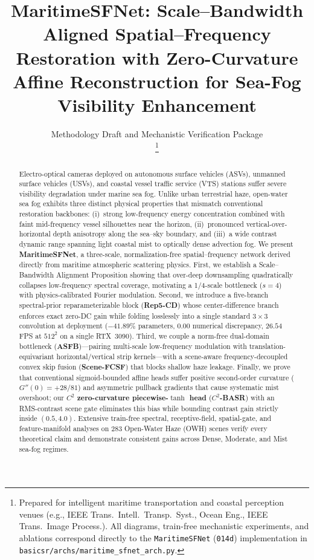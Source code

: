 \documentclass[journal,twoside]{IEEEtran}
\title{MaritimeSFNet: Scale--Bandwidth Aligned Spatial--Frequency Restoration with Zero-Curvature Affine Reconstruction for Sea-Fog Visibility Enhancement}
\author{Methodology Draft and Mechanistic Verification Package\\
\thanks{Prepared for intelligent maritime transportation and coastal perception venues (e.g., IEEE Trans.\ Intell.\ Transp.\ Syst., Ocean Eng., IEEE Trans.\ Image Process.). All diagrams, train-free mechanistic experiments, and ablations correspond directly to the \texttt{MaritimeSFNet} (\texttt{014d}) implementation in \texttt{basicsr/archs/maritime\_sfnet\_arch.py}.}}
\begin{document}
\maketitle

\begin{abstract}
Electro-optical cameras deployed on autonomous surface vehicles (ASVs), unmanned surface vehicles (USVs), and coastal vessel traffic service (VTS) stations suffer severe visibility degradation under marine sea fog. Unlike urban terrestrial haze, open-water sea fog exhibits three distinct physical properties that mismatch conventional restoration backbones: (i)~strong low-frequency energy concentration combined with faint mid-frequency vessel silhouettes near the horizon, (ii)~pronounced vertical-over-horizontal depth anisotropy along the sea--sky boundary, and (iii)~a wide contrast dynamic range spanning light coastal mist to optically dense advection fog. We present \textbf{MaritimeSFNet}, a three-scale, normalization-free spatial--frequency network derived directly from maritime atmospheric scattering physics. First, we establish a Scale--Bandwidth Alignment Proposition showing that over-deep downsampling quadratically collapses low-frequency spectral coverage, motivating a 1/4-scale bottleneck ($s=4$) with physics-calibrated Fourier modulation. Second, we introduce a five-branch spectral-prior reparameterizable block (\textbf{Rep5-CD}) whose center-difference branch enforces exact zero-DC gain while folding losslessly into a single standard $3\times 3$ convolution at deployment ($-41.89\%$ parameters, $0.00$ numerical discrepancy, $26.54$\,FPS at $512^2$ on a single RTX~3090). Third, we couple a norm-free dual-domain bottleneck (\textbf{ASFB})---pairing multi-scale low-frequency modulation with translation-equivariant horizontal/vertical strip kernels---with a scene-aware frequency-decoupled convex skip fusion (\textbf{Scene-FCSF}) that blocks shallow haze leakage. Finally, we prove that conventional sigmoid-bounded affine heads suffer positive second-order curvature ($G''(0)=+28/81$) and asymmetric pullback gradients that cause systematic mist overshoot; our \textbf{$C^2$ zero-curvature piecewise-$\tanh$ head} (\textbf{$C^2$-BASR}) with an RMS-contrast scene gate eliminates this bias while bounding contrast gain strictly inside $(0.5, 4.0)$. Extensive train-free spectral, receptive-field, spatial-gate, and feature-manifold analyses on 283 Open-Water Haze (OWH) scenes verify every theoretical claim and demonstrate consistent gains across Dense, Moderate, and Mist sea-fog regimes.
\end{abstract}
\end{document}
